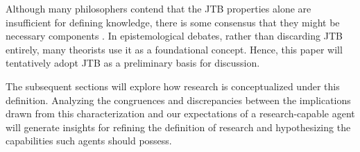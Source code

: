 Although many philosophers contend that the JTB properties alone are insufficient for defining knowledge, there is some consensus that they might be necessary components \cite{sep-epistemology}. In epistemological debates, rather than discarding JTB entirely, many theorists use it as a foundational concept. Hence, this paper will tentatively adopt JTB as a preliminary basis for discussion. 

The subsequent sections will explore how research is conceptualized under this definition. Analyzing the congruences and discrepancies between the implications drawn from this characterization and our expectations of a research-capable agent will generate insights for refining the definition of research and hypothesizing the capabilities such agents should possess.





